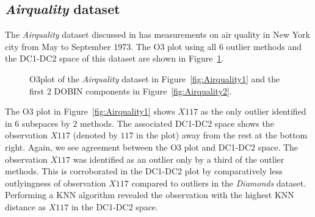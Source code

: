 \documentclass[letter,12pt]{article}
\begin{document}
\subsection{\textit{Airquality} dataset}\label{sec:ResWithVis4}

The \textit{Airquality} dataset discussed in \cite{john1983graphical} has measurements on air quality in New York city from May to September 1973. The O3 plot using all $6$ outlier methods and the DC1-DC2 space of this dataset are shown in Figure~\ref{fig:Airquality}.

\begin{figure}[!ht]
	\centering
	\hfill
	\caption{O3plot of the \textit{Airquality} dataset in Figure~\ref{fig:Airquality1} and the first 2 DOBIN components in Figure~\ref{fig:Airquality2}.}
	\label{fig:Airquality}
\end{figure}
The O3 plot in Figure~\ref{fig:Airquality1} shows $X117$ as the only outlier identified in $6$ subspaces by $2$ methods. The associated DC1-DC2 space shows the observation $X117$ (denoted by $117$ in the plot) away from the rest at the bottom right. Again, we see agreement between the O3 plot and DC1-DC2 space. The observation $X117$ was identified as an outlier only by a third of the outlier methods. This is corroborated in the DC1-DC2 plot by comparatively less outlyingness of observation $X117$ compared to outliers in the \textit{Diamonds} dataset. Performing a KNN algorithm revealed the observation with the highest KNN distance as $X117$ in the DC1-DC2 space.
\end{document}
